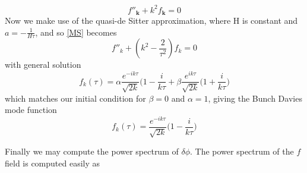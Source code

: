\documentclass[a4paper,10pt]{article}
\renewcommand{\v}[1]{\mathbf{#1}}
\begin{document}
\begin{equation}
f''_{\v{k}} + k^2f_{\v{k}} = 0
\end{equation}
Now we make use of the quasi-de Sitter approximation, where H is constant and $a=-\frac{1}{H\tau}$, and so \ref{MS} becomes
\begin{equation}
f''_k + (k^2-\frac{2}{\tau^2})f_k = 0
\end{equation}
with general solution
\begin{equation}
f_k(\tau) = \alpha \frac{e^{-ik\tau}}{\sqrt{2k}}{(1-\frac{i}{k\tau}} + \beta \frac{e^{ik\tau}}{\sqrt{2k}}{(1+\frac{i}{k\tau}})
\end{equation}
which matches our initial condition for $\beta = 0$ and $\alpha=1$, giving the Bunch Davies mode function 
\begin{equation}
f_k(\tau) = \frac{e^{-ik\tau}}{\sqrt{2k}}{(1-\frac{i}{k\tau}})
\end{equation}

Finally we may compute the power spectrum of $\delta\phi$. The power spectrum of the $f$ field is computed easily as 
\end{document}
